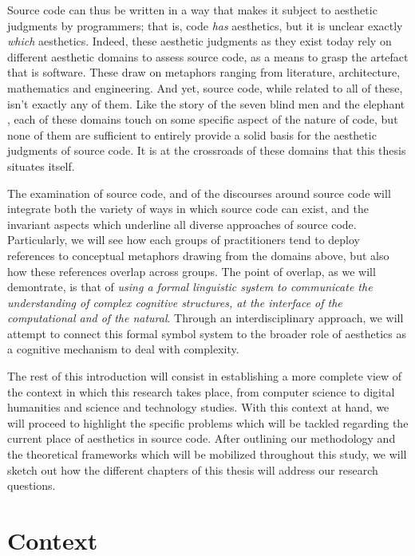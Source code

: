 Source code can thus be written in a way that makes it subject to aesthetic judgments by programmers; that is, code \emph{has} aesthetics, but it is unclear exactly \emph{which} aesthetics. Indeed, these aesthetic judgments as they exist today rely on different aesthetic domains to assess source code, as a means to grasp the artefact that is software. These draw on metaphors ranging from literature, architecture, mathematics and engineering. And yet, source code, while related to all of these, isn't exactly any of them. Like the story of the seven blind men and the elephant \citep{chun_sourcery_2008}, each of these domains touch on some specific aspect of the nature of code, but none of them are sufficient to entirely provide a solid basis for the aesthetic judgments of source code. It is at the crossroads of these domains that this thesis situates itself.

The examination of source code, and of the discourses around source code will integrate both the variety of ways in which source code can exist, and the invariant aspects which underline all diverse approaches of source code. Particularly, we will see how each groups of practitioners tend to deploy references to conceptual metaphors drawing from the domains above, but also how these references overlap across groups. The point of overlap, as we will demontrate, is that of \emph{using a formal linguistic system to communicate the understanding of complex cognitive structures, at the interface of the computational and of the natural}. Through an interdisciplinary approach, we will attempt to connect this formal symbol system to the broader role of aesthetics as a cognitive mechanism to deal with complexity.

The rest of this introduction will consist in establishing a more complete view of the context in which this research takes place, from computer science to digital humanities and science and technology studies. With this context at hand, we will proceed to highlight the specific problems which will be tackled regarding the current place of aesthetics in source code. After outlining our methodology and the theoretical frameworks which will be mobilized throughout this study, we will sketch out how the different chapters of this thesis will address our research questions.

\section{Context}
\label{sec:context}


